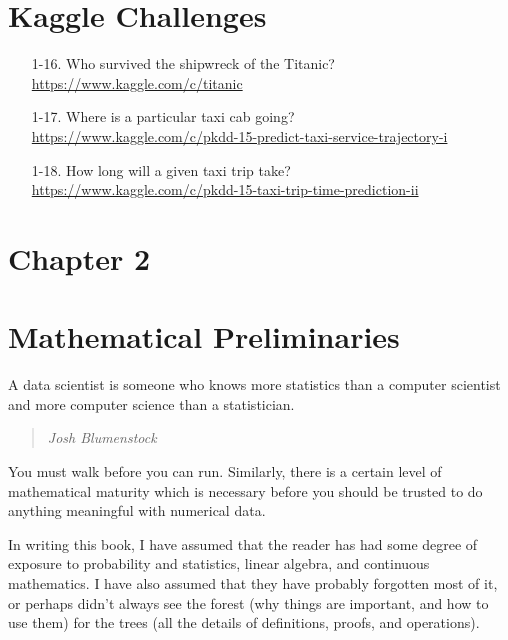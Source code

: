 \documentclass[10pt]{article}
\begin{document}
\section*{Kaggle Challenges}

\begin{enumerate}
    \item[1-16.] Who survived the shipwreck of the Titanic?\\
    \href{https://www.kaggle.com/c/titanic}{https://www.kaggle.com/c/titanic}

    \item[1-17.] Where is a particular taxi cab going?\\
    \href{https://www.kaggle.com/c/pkdd-15-predict-taxi-service-trajectory-i}{https://www.kaggle.com/c/pkdd-15-predict-taxi-service-trajectory-i}

    \item[1-18.] How long will a given taxi trip take?\\
    \href{https://www.kaggle.com/c/pkdd-15-taxi-trip-time-prediction-ii}{https://www.kaggle.com/c/pkdd-15-taxi-trip-time-prediction-ii}
\end{enumerate}

\section*{Chapter 2}
\section*{Mathematical Preliminaries}

A data scientist is someone who knows more statistics than a computer scientist and more computer science than a statistician.

\begin{quote}
    \itshape Josh Blumenstock
\end{quote}

You must walk before you can run. Similarly, there is a certain level of mathematical maturity which is necessary before you should be trusted to do anything meaningful with numerical data.

In writing this book, I have assumed that the reader has had some degree of exposure to probability and statistics, linear algebra, and continuous mathematics. I have also assumed that they have probably forgotten most of it, or perhaps didn't always see the forest (why things are important, and how to use them) for the trees (all the details of definitions, proofs, and operations).
\end{document}

